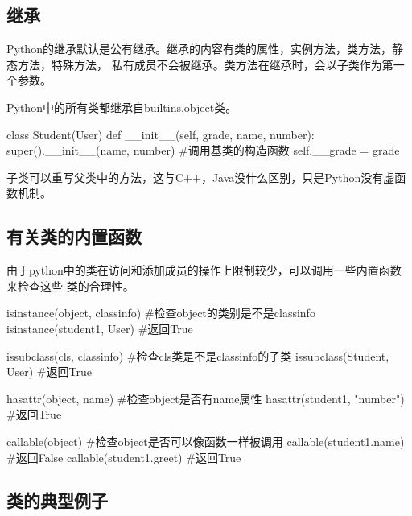 \documentclass{article}
\begin{document}
    \subsection{继承}
      Python的继承默认是公有继承。继承的内容有类的属性，实例方法，类方法，静态方法，特殊方法，
      私有成员不会被继承。类方法在继承时，会以子类作为第一个参数。

      Python中的所有类都继承自builtins.object类。
      \begin{codeblock}[language=python, caption={Class inheritance}]
        class Student(User)
            def __init__(self, grade, name, number):
                super().__init__(name, number) #调用基类的构造函数
                self.__grade = grade
      \end{codeblock}

      子类可以重写父类中的方法，这与C++，Java没什么区别，只是Python没有虚函数机制。

    \subsection{有关类的内置函数}
      由于python中的类在访问和添加成员的操作上限制较少，可以调用一些内置函数来检查这些
      类的合理性。
      \begin{codeblock}[language=python, caption={built-in functions about class}]
        isinstance(object, classinfo) #检查object的类别是不是classinfo
        isinstance(student1, User) #返回True

        issubclass(cls, classinfo) #检查cls类是不是classinfo的子类
        issubclass(Student, User) #返回True

        hasattr(object, name) #检查object是否有name属性
        hasattr(student1, "number") #返回True
        
        callable(object) #检查object是否可以像函数一样被调用
        callable(student1.name) #返回False
        callable(student1.greet) #返回True
      \end{codeblock}

    \subsection{类的典型例子}
\end{document}
